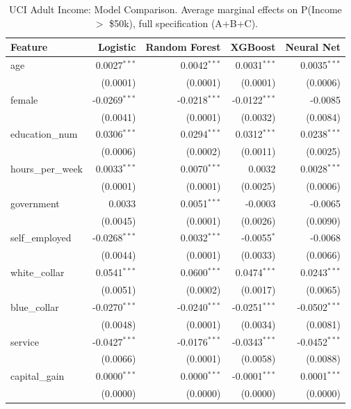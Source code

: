 \documentclass[conference]{IEEEtran}
\begin{document}
	\begin{table}[htbp]
		\centering
		\small
		\begin{threeparttable}
			\caption{UCI Adult Income: Model Comparison. Average marginal effects on P(Income $>$ \$50k), full specification (A+B+C).}
			\label{tab:adult_model_comparison}
			\begin{tabular}{lrrrr}
				\toprule
				Feature & Logistic & Random Forest & XGBoost & Neural Net \\
				\midrule
				age & 0.0027$^{***}$ & 0.0042$^{***}$ & 0.0031$^{***}$ & 0.0035$^{***}$ \\
				& (0.0001) & (0.0001) & (0.0001) & (0.0006) \\
				female & -0.0269$^{***}$ & -0.0218$^{***}$ & -0.0122$^{***}$ & -0.0085 \\
				& (0.0041) & (0.0001) & (0.0032) & (0.0084) \\
				education\_num & 0.0306$^{***}$ & 0.0294$^{***}$ & 0.0312$^{***}$ & 0.0238$^{***}$ \\
				& (0.0006) & (0.0002) & (0.0011) & (0.0025) \\
				\midrule
				hours\_per\_week & 0.0033$^{***}$ & 0.0070$^{***}$ & 0.0032 & 0.0028$^{***}$ \\
				& (0.0001) & (0.0001) & (0.0025) & (0.0006) \\
				government & 0.0033 & 0.0051$^{***}$ & -0.0003 & -0.0065 \\
				& (0.0045) & (0.0001) & (0.0026) & (0.0090) \\
				self\_employed & -0.0268$^{***}$ & 0.0032$^{***}$ & -0.0055$^{*}$ & -0.0068 \\
				& (0.0044) & (0.0001) & (0.0033) & (0.0066) \\
				white\_collar & 0.0541$^{***}$ & 0.0600$^{***}$ & 0.0474$^{***}$ & 0.0243$^{***}$ \\
				& (0.0051) & (0.0002) & (0.0017) & (0.0065) \\
				blue\_collar & -0.0270$^{***}$ & -0.0240$^{***}$ & -0.0251$^{***}$ & -0.0502$^{***}$ \\
				& (0.0048) & (0.0001) & (0.0034) & (0.0081) \\
				service & -0.0427$^{***}$ & -0.0176$^{***}$ & -0.0343$^{***}$ & -0.0452$^{***}$ \\
				& (0.0066) & (0.0001) & (0.0058) & (0.0088) \\
				\midrule
				capital\_gain & 0.0000$^{***}$ & 0.0000$^{***}$ & -0.0001$^{***}$ & 0.0001$^{***}$ \\
				& (0.0000) & (0.0000) & (0.0000) & (0.0000) \\

\end{tabular}
\end{threeparttable}
\end{table}
\end{document}
